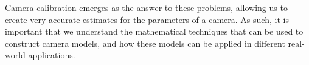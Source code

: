Camera calibration emerges as the answer to these problems, allowing us to create very accurate estimates for the parameters of a camera. As such, it is important that we understand the mathematical techniques that can be used to construct camera models, and how these models can be applied in different real-world applications.

